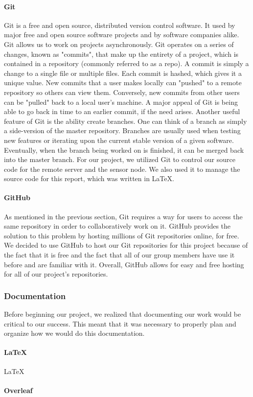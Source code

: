 \paragraph{Git}
Git is a free and open source, distributed version control software. It used by major free and open source software projects and by software companies alike. Git allows us to work on projects asynchronously. Git operates on a series of changes, known as "commits", that make up the entirety of a project, which is contained in a repository (commonly referred to as a repo). A commit is simply a change to a single file or multiple files. Each commit is hashed, which gives it a unique value. New commits that a user makes locally can "pushed" to a remote repository so others can view them. Conversely, new commits from other users can be "pulled" back to a local user's machine. A major appeal of Git is being able to go back in time to an earlier commit, if the need arises. Another useful feature of Git is the ability create branches. One can think of a branch as simply a side-version of the master repository. Branches are usually used when testing new features or iterating upon the current stable version of a given software. Eventually, when the branch being worked on is finished, it can be merged back into the master branch. For our project, we utilized Git to control our source code for the remote server and the sensor node. We also used it to manage the source code for this report, which was written in LaTeX.

\paragraph{GitHub}
As mentioned in the previous section, Git requires a way for users to access the same repository in order to collaboratively work on it. GitHub provides the solution to this problem by hosting millions of Git repositories online, for free. We decided to use GitHub to host our Git repositories for this project because of the fact that it is free and the fact that all of our group members have use it before and are familiar with it. Overall, GitHub allows for easy and free hosting for all of our project's repositories.

\subsubsection{Documentation}
Before beginning our project, we realized that documenting our work would be critical to our success. This meant that it was necessary to properly plan and organize how we would do this documentation.

\paragraph{LaTeX}
LaTeX

\paragraph{Overleaf}


